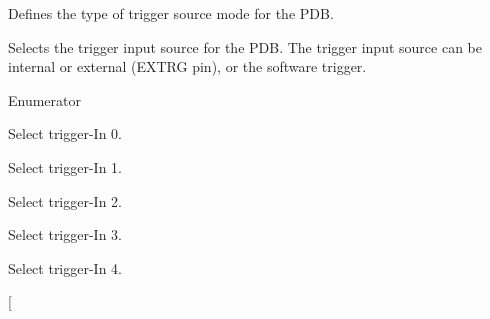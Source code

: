Defines the type of trigger source mode for the P\+DB. 

Selects the trigger input source for the P\+DB. The trigger input source can be internal or external (E\+X\+T\+RG pin), or the software trigger. \begin{Desc}
\item[Enumerator]\par
\begin{description}
\item[{\em 
k\+Pdb\+Trigger0\hypertarget{group__pdb__hal_gga436ffb28ac0668778b62d7e380815cb9a326ac4a938724616edf746894eaac4b9}{}\label{group__pdb__hal_gga436ffb28ac0668778b62d7e380815cb9a326ac4a938724616edf746894eaac4b9}
}]Select trigger-\/\+In 0. \item[{\em 
k\+Pdb\+Trigger1\hypertarget{group__pdb__hal_gga436ffb28ac0668778b62d7e380815cb9a809dd71c0be75e448c1a9824234608cd}{}\label{group__pdb__hal_gga436ffb28ac0668778b62d7e380815cb9a809dd71c0be75e448c1a9824234608cd}
}]Select trigger-\/\+In 1. \item[{\em 
k\+Pdb\+Trigger2\hypertarget{group__pdb__hal_gga436ffb28ac0668778b62d7e380815cb9aee0ceba4b2df0a48f9821d2ccfcc747b}{}\label{group__pdb__hal_gga436ffb28ac0668778b62d7e380815cb9aee0ceba4b2df0a48f9821d2ccfcc747b}
}]Select trigger-\/\+In 2. \item[{\em 
k\+Pdb\+Trigger3\hypertarget{group__pdb__hal_gga436ffb28ac0668778b62d7e380815cb9ae9e1661f83e67853cba9deef103fc6a3}{}\label{group__pdb__hal_gga436ffb28ac0668778b62d7e380815cb9ae9e1661f83e67853cba9deef103fc6a3}
}]Select trigger-\/\+In 3. \item[{\em 
k\+Pdb\+Trigger4\hypertarget{group__pdb__hal_gga436ffb28ac0668778b62d7e380815cb9a30f832c4a176f913b5406348a4f8bc2c}{}\label{group__pdb__hal_gga436ffb28ac0668778b62d7e380815cb9a30f832c4a176f913b5406348a4f8bc2c}
}]Select trigger-\/\+In 4. \item[{\em 
}
\end{description}
\end{Desc}
